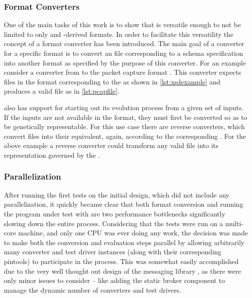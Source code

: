 \subsubsection{Format Converters}
One of the main tasks of this work is to show that \xmlmate is versatile enough to not be limited to 
only \xml and \xml-derived formats. In order to facilitate this versatility the concept of a format 
converter has been introduced. The main goal of a converter for a specific format is to convert an 
\xml file corresponding to a schema specification into another format as specified by the purpose 
of this converter. For an example consider a converter from \xml to the packet capture format \pcap. 
This converter expects \xml files in the format corresponding to the \pcap{} \xsd as shown in
\cref{lst:xsdexample} and produces a valid \pcap file as in \cref{lst:pcapfile}.

\xmlmate also has support for starting out its evolution process from a given set of inputs. If the   
inputs are not available in the \xml format, they must first be converted so as to be genetically 
representable. For this use case there are reverse converters, which convert files into their 
\xml equivalent, again, according to the corresponding \xsd. For the above example a reverse converter 
could transform any valid \pcap file into its \xml representation governed by the \pcap{} \xsd.
\subsubsection{Parallelization}
\label{sec:par}
After running the first tests on the initial \xmlmate design, which did not include any parallelization, 
it quickly became clear that both format conversion and running the program under test with \pin 
are two performance bottlenecks significantly slowing down the entire process. Considering that the 
tests were run on a multi-core machine, and only one CPU was ever doing any work, the decision was 
made to make both the conversion and evaluation steps parallel by allowing arbitrarily many 
converter and test driver instances (along with their corresponding pintools) to participate in the process. 
This was somewhat easily accomplished due to the very well thought out design of the messaging library \zmq, 
as there were only minor issues to consider -- like adding the static broker component to 
manage the dynamic number of converters and test drivers.

